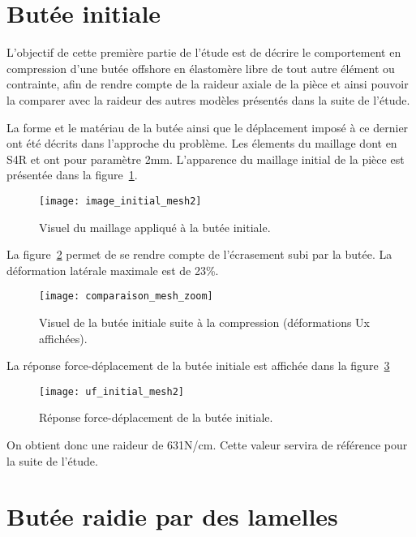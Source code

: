 ﻿\documentclass{article}
\newcommand{\cimg}{0.8}
\begin{document}
\section{Butée initiale}

L'objectif de cette première partie de l'étude est de décrire le comportement en compression d'une butée offshore en élastomère libre de tout autre élément ou contrainte, afin de rendre compte de la raideur axiale de la pièce et ainsi pouvoir la comparer avec la raideur des autres modèles présentés dans la suite de l'étude.

La forme et le matériau de la butée ainsi que le déplacement imposé à ce dernier ont été décrits dans l'approche du problème. Les élements du maillage dont en S4R et ont pour paramètre 2mm. L'apparence du maillage initial de la pièce est présentée dans la figure~\ref{fig3}.

\begin{figure}[!h]
	\centering
	\texttt{[image: image\_initial\_mesh2]}
	\caption{Visuel du maillage appliqué à la butée initiale.}
	\label{fig3}
\end{figure}

La figure~\ref{fig4} permet de se rendre compte de l'écrasement subi par la butée. La déformation latérale maximale est de 23\%.

\begin{figure}[!h]
	\centering
	\texttt{[image: comparaison\_mesh\_zoom]}
	\caption{Visuel de la butée initiale suite à la compression (déformations Ux affichées).}
	\label{fig4}
\end{figure}

La réponse force-déplacement de la butée initiale est affichée dans la figure~\ref{fig5}

\begin{figure}[!h]
	\centering
	\texttt{[image: uf\_initial\_mesh2]}
	\caption{Réponse force-déplacement de la butée initiale.}
	\label{fig5}
\end{figure}

On obtient donc une raideur de 631N/cm. Cette valeur servira de référence pour la suite de l'étude.


\section{Butée raidie par des lamelles}
\end{document}
